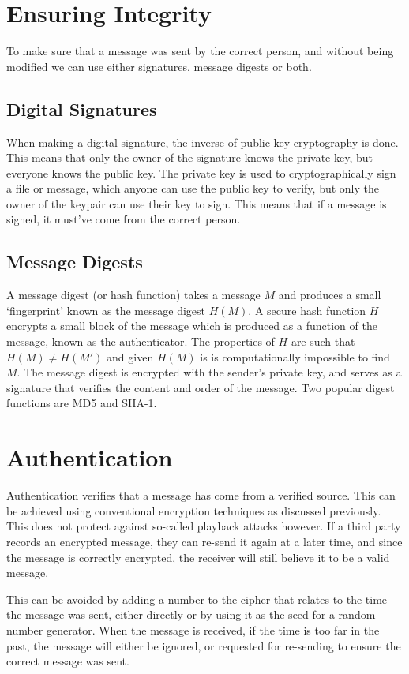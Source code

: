 \section*{Ensuring Integrity}

To make sure that a message was sent by the correct person, and without being modified we can use either signatures,
 message digests or both.

\subsection*{Digital Signatures}

When making a digital signature, the inverse of public-key cryptography is done. This means that only the owner of the
 signature knows the private key, but everyone knows the public key. The private key is used to cryptographically sign
 a file or message, which anyone can use the public key to verify, but only the owner of the keypair can use their key
 to sign. This means that if a message is signed, it must've come from the correct person.

\subsection*{Message Digests}

A message digest (or hash function) takes a message $M$ and produces a small `fingerprint' known as the message digest
 $H(M)$. A secure hash function $H$ encrypts a small block of the message which is produced as a function of the message,
 known as the authenticator. The properties of $H$ are such that $H(M) \neq H(M')$ and given $H(M)$ is is computationally
 impossible to find $M$. The message digest is encrypted with the sender's private key, and serves as a signature that
 verifies the content and order of the message. Two popular digest functions are MD5 and SHA-1.

\section*{Authentication}

Authentication verifies that a message has come from a verified source. This can be achieved using conventional encryption
 techniques as discussed previously. This does not protect against so-called playback attacks however. If a third party
 records an encrypted message, they can re-send it again at a later time, and since the message is correctly encrypted,
 the receiver will still believe it to be a valid message.

This can be avoided by adding a number to the cipher that relates to the time the message was sent, either directly or
 by using it as the seed for a random number generator. When the message is received, if the time is too far in the
 past, the message will either be ignored, or requested for re-sending to ensure the correct message was sent.